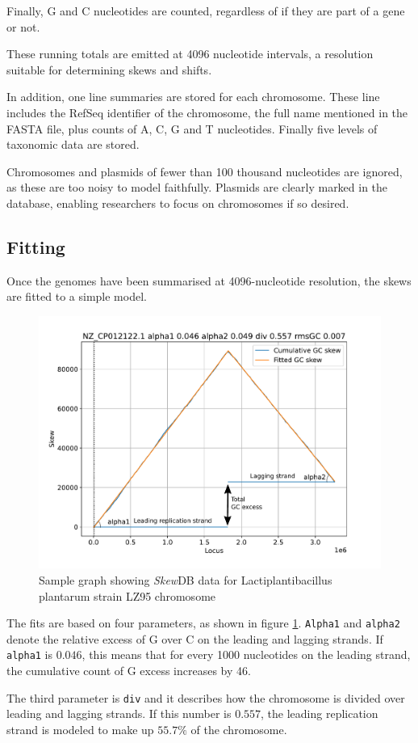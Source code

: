 \documentclass[fleqn,10pt]{wlscirep}
\begin{document}
Finally, G and C nucleotides are counted, regardless of if they are part of a gene or not.

These running totals are emitted at 4096 nucleotide intervals, a resolution suitable for determining skews and shifts.

In addition, one line summaries are stored for each chromosome. These line includes the RefSeq identifier of the chromosome, the full name mentioned in the FASTA file, plus counts of A, C, G and T nucleotides. Finally five levels of taxonomic data are stored.

Chromosomes and plasmids of fewer than 100 thousand nucleotides are ignored, as these are too noisy to model faithfully. Plasmids are clearly marked in the database, enabling researchers to focus on chromosomes if so desired.

\subsection*{Fitting}
Once the genomes have been summarised at 4096-nucleotide resolution, the skews are fitted to a simple model.

\begin{figure}[ht]
\centering
\includegraphics[width=0.7\linewidth]{explainer.pdf}
\caption{Sample graph showing \emph{Skew}DB data for Lactiplantibacillus plantarum strain LZ95 chromosome}
\label{fig:explainer-graph}
\end{figure}

The fits are based on four parameters, as shown in figure \ref{fig:explainer-graph}. {\tt Alpha1} and {\tt alpha2} denote the relative excess of G over C on the leading and lagging strands. If {\tt alpha1} is $0.046$, this means that for every 1000 nucleotides on the leading strand, the cumulative count of G excess increases by 46.

The third parameter is {\tt div} and it describes how the chromosome is divided over leading and lagging strands. If this number is $0.557$, the leading replication strand is modeled to make up $55.7\%$ of the chromosome.
\end{document}

